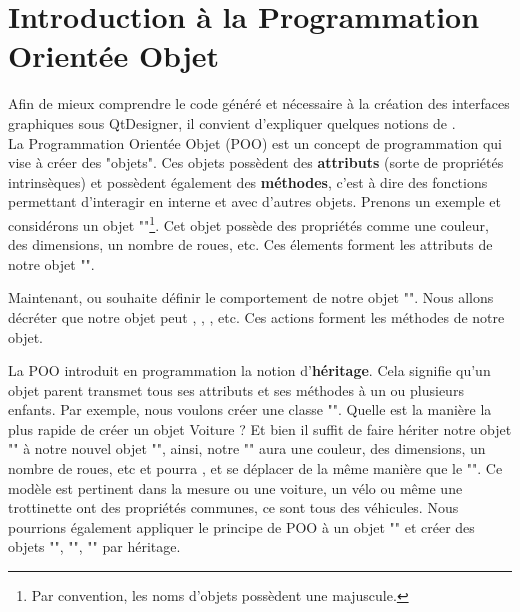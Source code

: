 \section{Introduction à la Programmation Orientée Objet}
Afin de mieux comprendre le code généré et nécessaire à la création des interfaces graphiques sous QtDesigner, il convient d'expliquer quelques notions de . \\

La Programmation Orientée Objet (POO) est un concept de programmation qui vise à créer des "objets". \newline \newline
Ces objets possèdent des \textbf{attributs} (sorte de propriétés intrinsèques) et possèdent également des \textbf{méthodes}, c'est à dire des fonctions permettant d'interagir en interne et avec d'autres objets. \newline \newline
Prenons un exemple et considérons un objet ""\footnote{Par convention, les noms d'objets possèdent une majuscule.}. \newline
Cet objet possède des propriétés comme une couleur, des dimensions, un nombre de roues, etc. Ces élements forment les attributs de notre objet "". \newline


Maintenant, ou souhaite définir le comportement de notre objet "". Nous allons décréter que notre objet peut , , , etc.
Ces actions forment les méthodes de notre objet.\newline \newline



La POO introduit en programmation la notion d'\textbf{héritage}. \newline
Cela signifie qu'un objet parent transmet tous ses attributs et ses méthodes à un ou plusieurs enfants. \newline
Par exemple, nous voulons créer une classe "". Quelle est la manière la plus rapide de créer un objet Voiture ? Et bien il suffit de faire hériter notre objet "" à notre nouvel objet "", ainsi, notre "" aura une couleur, des dimensions, un nombre de roues, etc et pourra ,  et se déplacer de la même manière que le "". \newline Ce modèle est pertinent dans la mesure ou une voiture, un vélo ou même une trottinette ont des propriétés communes, ce sont tous des véhicules. \newline
Nous pourrions également appliquer le principe de POO à un objet "" et créer des objets "", "", "" par héritage. \newline


